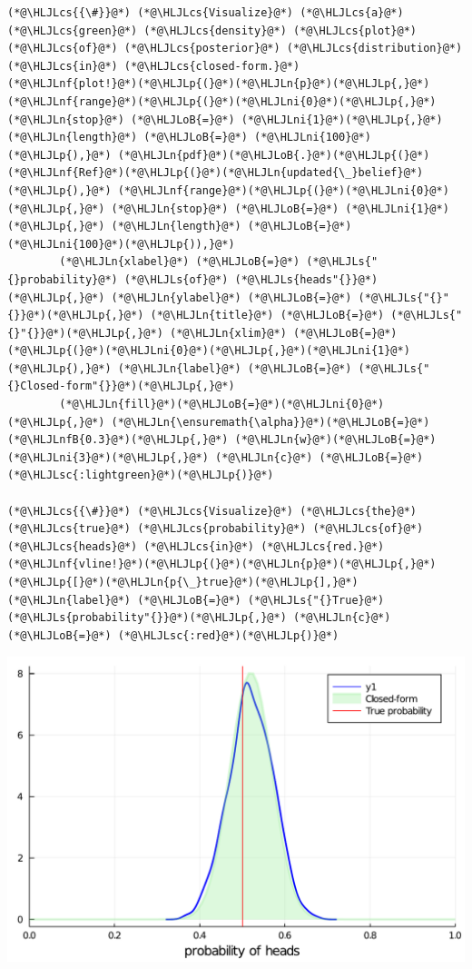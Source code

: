 \documentclass[12pt,a4paper]{article}
\newcommand{\HLJLn}[1]{#1}
\newcommand{\HLJLnf}[1]{\textcolor[RGB]{66,102,213}{#1}}
\newcommand{\HLJLs}[1]{\textcolor[RGB]{201,61,57}{#1}}
\newcommand{\HLJLsc}[1]{\textcolor[RGB]{201,61,57}{#1}}
\newcommand{\HLJLnfB}[1]{\textcolor[RGB]{59,151,46}{#1}}
\newcommand{\HLJLni}[1]{\textcolor[RGB]{59,151,46}{#1}}
\newcommand{\HLJLoB}[1]{\textcolor[RGB]{102,102,102}{\textbf{#1}}}
\newcommand{\HLJLp}[1]{#1}
\newcommand{\HLJLcs}[1]{\textcolor[RGB]{153,153,119}{\textit{#1}}}
\begin{document}
\begin{lstlisting}
(*@\HLJLcs{{\#}}@*) (*@\HLJLcs{Visualize}@*) (*@\HLJLcs{a}@*) (*@\HLJLcs{green}@*) (*@\HLJLcs{density}@*) (*@\HLJLcs{plot}@*) (*@\HLJLcs{of}@*) (*@\HLJLcs{posterior}@*) (*@\HLJLcs{distribution}@*) (*@\HLJLcs{in}@*) (*@\HLJLcs{closed-form.}@*)
(*@\HLJLnf{plot!}@*)(*@\HLJLp{(}@*)(*@\HLJLn{p}@*)(*@\HLJLp{,}@*) (*@\HLJLnf{range}@*)(*@\HLJLp{(}@*)(*@\HLJLni{0}@*)(*@\HLJLp{,}@*) (*@\HLJLn{stop}@*) (*@\HLJLoB{=}@*) (*@\HLJLni{1}@*)(*@\HLJLp{,}@*) (*@\HLJLn{length}@*) (*@\HLJLoB{=}@*) (*@\HLJLni{100}@*)(*@\HLJLp{),}@*) (*@\HLJLn{pdf}@*)(*@\HLJLoB{.}@*)(*@\HLJLp{(}@*)(*@\HLJLnf{Ref}@*)(*@\HLJLp{(}@*)(*@\HLJLn{updated{\_}belief}@*)(*@\HLJLp{),}@*) (*@\HLJLnf{range}@*)(*@\HLJLp{(}@*)(*@\HLJLni{0}@*)(*@\HLJLp{,}@*) (*@\HLJLn{stop}@*) (*@\HLJLoB{=}@*) (*@\HLJLni{1}@*)(*@\HLJLp{,}@*) (*@\HLJLn{length}@*) (*@\HLJLoB{=}@*) (*@\HLJLni{100}@*)(*@\HLJLp{)),}@*) 
        (*@\HLJLn{xlabel}@*) (*@\HLJLoB{=}@*) (*@\HLJLs{"{}probability}@*) (*@\HLJLs{of}@*) (*@\HLJLs{heads"{}}@*)(*@\HLJLp{,}@*) (*@\HLJLn{ylabel}@*) (*@\HLJLoB{=}@*) (*@\HLJLs{"{}"{}}@*)(*@\HLJLp{,}@*) (*@\HLJLn{title}@*) (*@\HLJLoB{=}@*) (*@\HLJLs{"{}"{}}@*)(*@\HLJLp{,}@*) (*@\HLJLn{xlim}@*) (*@\HLJLoB{=}@*) (*@\HLJLp{(}@*)(*@\HLJLni{0}@*)(*@\HLJLp{,}@*)(*@\HLJLni{1}@*)(*@\HLJLp{),}@*) (*@\HLJLn{label}@*) (*@\HLJLoB{=}@*) (*@\HLJLs{"{}Closed-form"{}}@*)(*@\HLJLp{,}@*)
        (*@\HLJLn{fill}@*)(*@\HLJLoB{=}@*)(*@\HLJLni{0}@*)(*@\HLJLp{,}@*) (*@\HLJLn{\ensuremath{\alpha}}@*)(*@\HLJLoB{=}@*)(*@\HLJLnfB{0.3}@*)(*@\HLJLp{,}@*) (*@\HLJLn{w}@*)(*@\HLJLoB{=}@*)(*@\HLJLni{3}@*)(*@\HLJLp{,}@*) (*@\HLJLn{c}@*) (*@\HLJLoB{=}@*) (*@\HLJLsc{:lightgreen}@*)(*@\HLJLp{)}@*)

(*@\HLJLcs{{\#}}@*) (*@\HLJLcs{Visualize}@*) (*@\HLJLcs{the}@*) (*@\HLJLcs{true}@*) (*@\HLJLcs{probability}@*) (*@\HLJLcs{of}@*) (*@\HLJLcs{heads}@*) (*@\HLJLcs{in}@*) (*@\HLJLcs{red.}@*)
(*@\HLJLnf{vline!}@*)(*@\HLJLp{(}@*)(*@\HLJLn{p}@*)(*@\HLJLp{,}@*) (*@\HLJLp{[}@*)(*@\HLJLn{p{\_}true}@*)(*@\HLJLp{],}@*) (*@\HLJLn{label}@*) (*@\HLJLoB{=}@*) (*@\HLJLs{"{}True}@*) (*@\HLJLs{probability"{}}@*)(*@\HLJLp{,}@*) (*@\HLJLn{c}@*) (*@\HLJLoB{=}@*) (*@\HLJLsc{:red}@*)(*@\HLJLp{)}@*)
\end{lstlisting}

\includegraphics[width=\linewidth]{jl_USrzxA/00_introduction_10_1.pdf}
\end{document}
